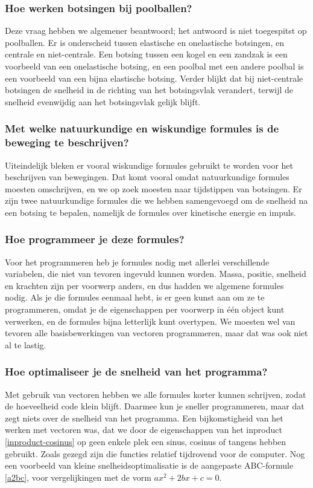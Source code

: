 \documentclass[12pt,a4paper]{article}
\begin{document}
	\subsubsection{Hoe werken botsingen bij poolballen?}
	Deze vraag hebben we algemener beantwoord; het antwoord is niet toegespitst op poolballen. Er is onderscheid tussen elastische en onelastische botsingen, en centrale en niet-centrale. Een botsing tussen een kogel en een zandzak is een voorbeeld van een onelastische botsing, en een poolbal met een andere poolbal is een voorbeeld van een bijna elastische botsing. Verder blijkt dat bij niet-centrale botsingen de snelheid in de richting van het botsingsvlak verandert, terwijl de snelheid evenwijdig aan het botsingsvlak gelijk blijft.

	\subsubsection{Met welke natuurkundige en wiskundige formules is de beweging te beschrijven?}
	Uiteindelijk bleken er vooral wiskundige formules gebruikt te worden voor het beschrijven van bewegingen. Dat komt vooral omdat natuurkundige formules moesten omschrijven, en we op zoek moesten naar tijdstippen van botsingen. Er zijn twee natuurkundige formules die we hebben samengevoegd om de snelheid na een botsing te bepalen, namelijk de formules over kinetische energie en impuls.

	\subsubsection{Hoe programmeer je deze formules?}
	Voor het programmeren heb je formules nodig met allerlei verschillende variabelen, die niet van tevoren ingevuld kunnen worden. Massa, positie, snelheid en krachten zijn per voorwerp anders, en dus hadden we algemene formules nodig. Als je die formules eenmaal hebt, is er geen kunst aan om ze te programmeren, omdat je de eigenschappen per voorwerp in \'{e}\'{e}n object kunt verwerken, en de formules bijna letterlijk kunt overtypen. We moesten wel van tevoren alle basisbewerkingen van vectoren programmeren, maar dat was ook niet al te lastig.

	\subsubsection{Hoe optimaliseer je de snelheid van het programma?}
	Met gebruik van vectoren hebben we alle formules korter kunnen schrijven, zodat de hoeveelheid code klein blijft. Daarmee kun je sneller programmeren, maar dat zegt niets over de snelheid van het programma. Een bijkomstigheid van het werken met vectoren was, dat we door de eigenschappen van het inproduct \eqref{inproduct-cosinus} op geen enkele plek een sinus, cosinus of tangens hebben gebruikt. Zoals gezegd zijn die functies relatief tijdrovend voor de computer. Nog een voorbeeld van kleine snelheidsoptimalisatie is de aangepaste ABC-formule \eqref{a2bc}, voor vergelijkingen met de vorm $ax^2+2bx+c=0$.
	
\end{document}
